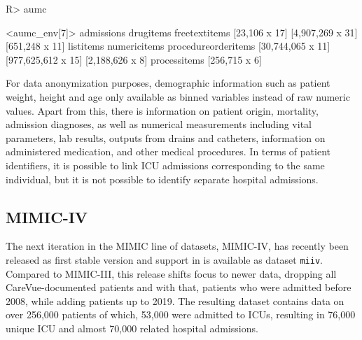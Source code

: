 \documentclass[
  notitle]{jss}
\begin{document}
\begin{CodeChunk}
\begin{CodeInput}
R> aumc
\end{CodeInput}
\begin{CodeOutput}
<aumc_env[7]>
         admissions           drugitems       freetextitems 
      [23,106 x 17]    [4,907,269 x 31]      [651,248 x 11] 
          listitems        numericitems procedureorderitems 
  [30,744,065 x 11]  [977,625,612 x 15]     [2,188,626 x 8] 
       processitems 
      [256,715 x 6] 
\end{CodeOutput}
\end{CodeChunk}

For data anonymization purposes, demographic information such as patient
weight, height and age only available as binned variables instead of raw
numeric values. Apart from this, there is information on patient origin,
mortality, admission diagnoses, as well as numerical measurements
including vital parameters, lab results, outputs from drains and
catheters, information on administered medication, and other medical
procedures. In terms of patient identifiers, it is possible to link ICU
admissions corresponding to the same individual, but it is not possible
to identify separate hospital admissions.

\hypertarget{mimic-iv}{%
\subsection{MIMIC-IV}\label{mimic-iv}}

The next iteration in the MIMIC line of datasets, MIMIC-IV, has recently
been released as first stable version \citep{johnson2021} and support in
 is available as dataset \texttt{miiv}. Compared to MIMIC-III,
this release shifts focus to newer data, dropping all CareVue-documented
patients and with that, patients who were admitted before 2008, while
adding patients up to 2019. The resulting dataset contains data on over
256,000 patients of which, 53,000 were admitted to ICUs, resulting in
76,000 unique ICU and almost 70,000 related hospital admissions.
\end{document}
